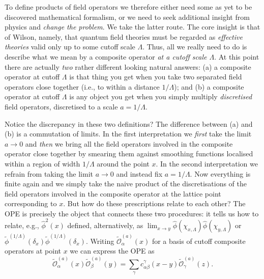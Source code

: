 \documentclass[prl,twocolumn,lengthcheck,superscriptaddress]{revtex4-1}
\theoremstyle{definition}
\theoremstyle{remark}
\begin{document}
To define products of field operators we therefore either need some as yet to be discovered mathematical formalism, or we need to seek additional insight from physics and \emph{change the problem}. We take the latter route. The core insight is that of Wilson, namely, that quantum field theories must be regarded as \emph{effective theories} valid only up to some cutoff scale $\Lambda$. Thus, all we really need to do is describe what we mean by a composite operator \emph{at a cutoff scale $\Lambda$}. At this point there are actually \emph{two} rather different looking natural answers: (a) a composite operator at cutoff $\Lambda$ is that thing you get when you take two separated field operators close together (i.e., to within a distance $1/\Lambda$); and (b) a composite operator at cutoff $\Lambda$ is any object you get when you simply multiply \emph{discretised} field operators, discretised to a scale $a = 1/\Lambda$. 

Notice the discrepancy in these two definitions? The difference between (a) and (b) is a commutation of limits. In the first interpretation we \emph{first} take the limit $a\rightarrow 0$ and \emph{then} we bring all the field operators involved in the composite operator close together by smearing them against smoothing functions localised within a region of width $1/\Lambda$ around the point $x$. In the second interpretation we refrain from taking the limit $a\rightarrow 0$ and instead fix $a= 1/\Lambda$. Now everything is finite again and we simply take the naive product of the discretisations of the field operators involved in the composite operator at the lattice point corresponding to $x$. But how do these prescriptions relate to each other? The OPE is precisely the object that connects these two procedures: it tells us how to relate, e.g., $\widehat{\phi}^2(x)$ defined, alternatively, as $\lim_{x\rightarrow y} \widehat{\phi}(\chi_{x,\Lambda})\widehat{\phi}(\chi_{y,\Lambda})$ or $\widetilde{\phi}^{(1/\Lambda)}(\delta_x)\widetilde{\phi}^{(1/\Lambda)}(\delta_x)$. Writing $\widetilde{\mathcal{O}}^{(a)}_\alpha(x)$ for a basis of cutoff composite operators at point $x$ we can express the OPE as
\begin{equation}
	\widetilde{\mathcal{O}}^{(a)}_\alpha(x)\widetilde{\mathcal{O}}^{(a)}_\beta(y) = \sum_{\gamma} c_{\alpha\beta}^\gamma(x-y) \widetilde{\mathcal{O}}^{(a)}_\gamma(z).
\end{equation}
\end{document}

